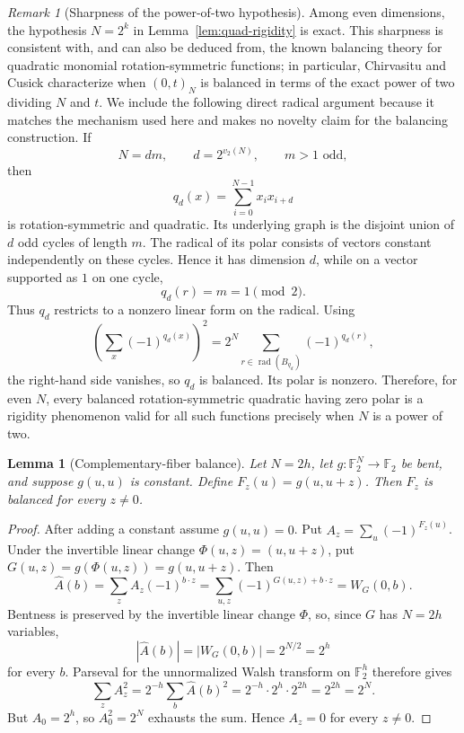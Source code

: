 \documentclass[11pt,a4paper]{article}
\newtheorem{lemma}[theorem]{Lemma}
\theoremstyle{remark}
\newtheorem{remark}[theorem]{Remark}
\theoremstyle{plain}
\newcommand{\F}{\mathbb F_2}
\begin{document}
\begin{remark}[Sharpness of the power-of-two hypothesis]\label{rem:quad-sharp}
Among even dimensions, the hypothesis \(N=2^k\) in Lemma~\ref{lem:quad-rigidity} is exact. This sharpness is consistent with, and can also be deduced from, the known balancing theory for quadratic monomial rotation-symmetric functions; in particular, Chirvasitu and Cusick characterize when \((0,t)_N\) is balanced in terms of the exact power of two dividing \(N\) and \(t\). We include the following direct radical argument because it matches the mechanism used here and makes no novelty claim for the balancing construction. If
\[
N=dm,\qquad d=2^{v_2(N)},\qquad m>1\text{ odd},
\]
then
\[
q_d(x)=\sum_{i=0}^{N-1}x_i x_{i+d}
\]
is rotation-symmetric and quadratic. Its underlying graph is the disjoint union of \(d\) odd cycles of length \(m\). The radical of its polar consists of vectors constant independently on these cycles. Hence it has dimension \(d\), while on a vector supported as \(1\) on one cycle,
\[
q_d(r)=m=1\pmod2.
\]
Thus \(q_d\) restricts to a nonzero linear form on the radical. Using
\[
\left(\sum_x(-1)^{q_d(x)}\right)^2
=2^N\sum_{r\in\operatorname{rad}(B_{q_d})}(-1)^{q_d(r)},
\]
the right-hand side vanishes, so \(q_d\) is balanced. Its polar is nonzero. Therefore, for even \(N\), every balanced rotation-symmetric quadratic having zero polar is a rigidity phenomenon valid for all such functions precisely when \(N\) is a power of two.
\end{remark}

\begin{lemma}[Complementary-fiber balance]\label{lem:fiber-balance}
Let \(N=2h\), let \(g:\F^N\to\F\) be bent, and suppose \(g(u,u)\) is constant. Define \(F_z(u)=g(u,u+z)\). Then \(F_z\) is balanced for every \(z\ne0\).
\end{lemma}
\begin{proof}
After adding a constant assume \(g(u,u)=0\). Put \(A_z=\sum_u(-1)^{F_z(u)}\). Under the invertible linear change \(\Phi(u,z)=(u,u+z)\), put \(G(u,z)=g(\Phi(u,z))=g(u,u+z)\). Then
\[
\widehat A(b)=\sum_z A_z(-1)^{b\cdot z}
=\sum_{u,z}(-1)^{G(u,z)+b\cdot z}
=W_G(0,b).
\]
Bentness is preserved by the invertible linear change \(\Phi\), so, since \(G\) has \(N=2h\) variables,
\[
|\widehat A(b)|=|W_G(0,b)|=2^{N/2}=2^h
\]
for every \(b\). Parseval for the unnormalized Walsh transform on \(\F^h\) therefore gives
\[
\sum_zA_z^2
=2^{-h}\sum_b\widehat A(b)^2
=2^{-h}\cdot 2^h\cdot 2^{2h}
=2^{2h}=2^N.
\]
But \(A_0=2^h\), so \(A_0^2=2^N\) exhausts the sum. Hence \(A_z=0\) for every \(z\ne0\).
\end{proof}
\end{document}
